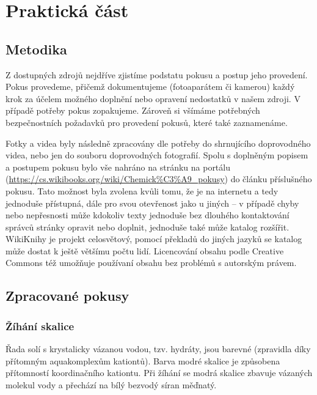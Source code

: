 \chapter{Praktická část}

\section{Metodika}
Z dostupných zdrojů nejdříve zjistíme podstatu pokusu a postup jeho provedení. Pokus provedeme, přičemž dokumentujeme (fotoaparátem či kamerou) každý krok za účelem možného doplnění nebo opravení nedostatků v našem zdroji. V případě potřeby pokus zopakujeme. Zároveň si všímáme potřebných bezpečnostních požadavků pro provedení pokusů, které také zaznamenáme.

Fotky a videa byly následně zpracovány dle potřeby do shrnujícího doprovodného videa, nebo jen do souboru doprovodných fotografií. Spolu s doplněným popisem a postupem pokusu bylo vše nahráno na stránku  na portálu  (\url{https://cs.wikibooks.org/wiki/Chemick%C3%A9_pokusy}) do článku příslušného pokusu. Tato možnost byla zvolena kvůli tomu, že je na internetu a tedy jednoduše přístupná, dále pro svou otevřenost jako u jiných \uv{wiki projektů} -- v případě chyby nebo nepřesnosti může kdokoliv texty jednoduše bez dlouhého kontaktování správců stránky opravit nebo doplnit, jednoduše také může katalog rozšířit. WikiKnihy je projekt celosvětový, pomocí překladů do jiných jazyků se katalog může dostat k ještě většímu počtu lidí. Licencování obsahu podle Creative Commons též umožňuje používaní obsahu bez problémů s autorským právem.


\section{Zpracované pokusy}
\subsection{Žíhání skalice}



Řada solí s krystalicky vázanou vodou, tzv. hydráty, jsou barevné (zpravidla díky přítomným aquakomplexům kationtů). Barva modré skalice je způsobena přítomností koordinačního kationtu. Při žíhání se modrá skalice zbavuje vázaných molekul vody a přechází na bílý bezvodý síran měďnatý.


